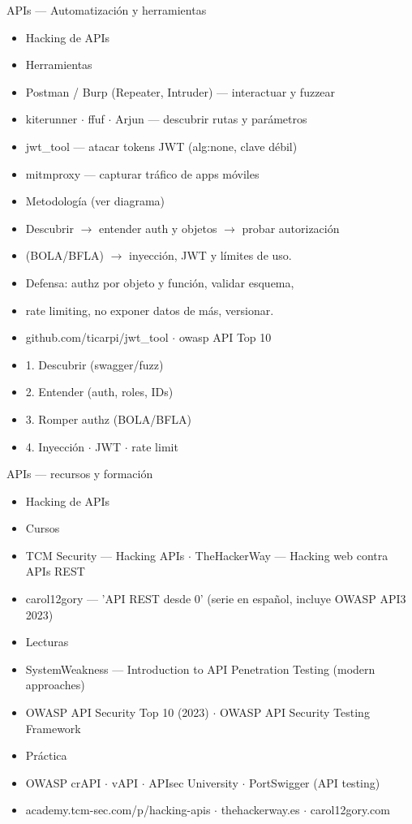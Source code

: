 \documentclass[aspectratio=169,10pt]{beamer}
\begin{document}
\begin{frame}[allowframebreaks]{APIs --- Automatización y herramientas}
\small
  \begin{itemize}
  \item Hacking de APIs
  \item Herramientas
  \item Postman / Burp (Repeater, Intruder) --- interactuar y fuzzear
  \item kiterunner $\cdot$ ffuf $\cdot$ Arjun --- descubrir rutas y parámetros
  \item jwt\_tool --- atacar tokens JWT (alg:none, clave débil)
  \item mitmproxy --- capturar tráfico de apps móviles
  \item Metodología (ver diagrama)
  \item Descubrir $\rightarrow$ entender auth y objetos $\rightarrow$ probar autorización
  \item (BOLA/BFLA) $\rightarrow$ inyección, JWT y límites de uso.
  \item Defensa: authz por objeto y función, validar esquema,
  \item rate limiting, no exponer datos de más, versionar.
  \item github.com/ticarpi/jwt\_tool $\cdot$ owasp API Top 10
  \item 1. Descubrir (swagger/fuzz)
  \item 2. Entender (auth, roles, IDs)
  \item 3. Romper authz (BOLA/BFLA)
  \item 4. Inyección $\cdot$ JWT $\cdot$ rate limit
  \end{itemize}
\end{frame}

\begin{frame}[allowframebreaks]{APIs --- recursos y formación}
\small
  \begin{itemize}
  \item Hacking de APIs
  \item Cursos
  \item TCM Security --- Hacking APIs $\cdot$ TheHackerWay --- Hacking web contra APIs REST
  \item carol12gory --- 'API REST desde 0' (serie en español, incluye OWASP API3 2023)
  \item Lecturas
  \item SystemWeakness --- Introduction to API Penetration Testing (modern approaches)
  \item OWASP API Security Top 10 (2023) $\cdot$ OWASP API Security Testing Framework
  \item Práctica
  \item OWASP crAPI $\cdot$ vAPI $\cdot$ APIsec University $\cdot$ PortSwigger (API testing)
  \item academy.tcm-sec.com/p/hacking-apis $\cdot$ thehackerway.es $\cdot$ carol12gory.com
  \end{itemize}
\end{frame}
\end{document}
